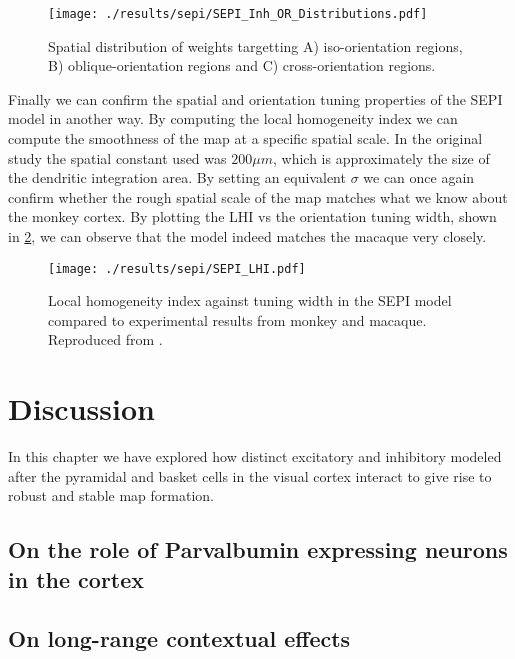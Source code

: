 \begin{figure}
	\centering
        \texttt{[image: ./results/sepi/SEPI\_Inh\_OR\_Distributions.pdf]}
	\caption{Spatial distribution of weights targetting A)
      iso-orientation regions, B) oblique-orientation regions and C)
      cross-orientation regions.}
	\label{SEPI_OR_Distributions}
\end{figure}

Finally we can confirm the spatial and orientation tuning properties
of the SEPI model in another way. By computing the local homogeneity
index we can compute the smoothness of the map at a specific spatial
scale. In the original study \citep{Nauhaus2008} the spatial constant
used was $200 \mu m$, which is approximately the size of the dendritic
integration area. By setting an equivalent $\sigma$ we can once again
confirm whether the rough spatial scale of the map matches what we
know about the monkey cortex. By plotting the LHI vs the orientation
tuning width, shown in \ref{SEPILHI}, we can observe that the model
indeed matches the macaque very closely.

\begin{figure}
	\centering
        \texttt{[image: ./results/sepi/SEPI\_LHI.pdf]}
	\caption{Local homogeneity index against tuning width in the SEPI
      model compared to experimental results from monkey and
      macaque. Reproduced from \cite{Nauhaus2008}.}
	\label{SEPILHI}
\end{figure}


\section{Discussion}

In this chapter we have explored how distinct excitatory and
inhibitory modeled after the pyramidal and basket cells in the visual
cortex interact to give rise to robust and stable map formation.

\subsection{On the role of Parvalbumin expressing neurons in the cortex}

\subsection{On long-range contextual effects}
